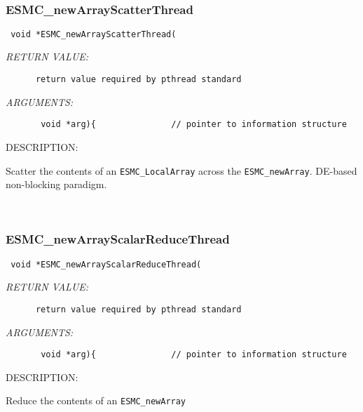    
 
\mbox{}\hrulefill\
 
\subsubsection [ESMC\_newArrayScatterThread] {ESMC\_newArrayScatterThread}


  
\begin{verbatim} void *ESMC_newArrayScatterThread(\end{verbatim}{\em RETURN VALUE:}
\begin{verbatim}      return value required by pthread standard\end{verbatim}{\em ARGUMENTS:}
\begin{verbatim}       void *arg){               // pointer to information structure\end{verbatim}
{\sf DESCRIPTION:\\ }


      Scatter the contents of an {\tt ESMC\_LocalArray} across the
      {\tt ESMC\_newArray}. DE-based non-blocking paradigm.
   
 
\mbox{}\hrulefill\
 
\subsubsection [ESMC\_newArrayScalarReduceThread] {ESMC\_newArrayScalarReduceThread}


  
\begin{verbatim} void *ESMC_newArrayScalarReduceThread(\end{verbatim}{\em RETURN VALUE:}
\begin{verbatim}      return value required by pthread standard\end{verbatim}{\em ARGUMENTS:}
\begin{verbatim}       void *arg){               // pointer to information structure\end{verbatim}
{\sf DESCRIPTION:\\ }


      Reduce the contents of an {\tt ESMC\_newArray}
  
\setlength{\parskip}{\oldparskip}
\setlength{\parindent}{\oldparindent}
\setlength{\baselineskip}{\oldbaselineskip}
